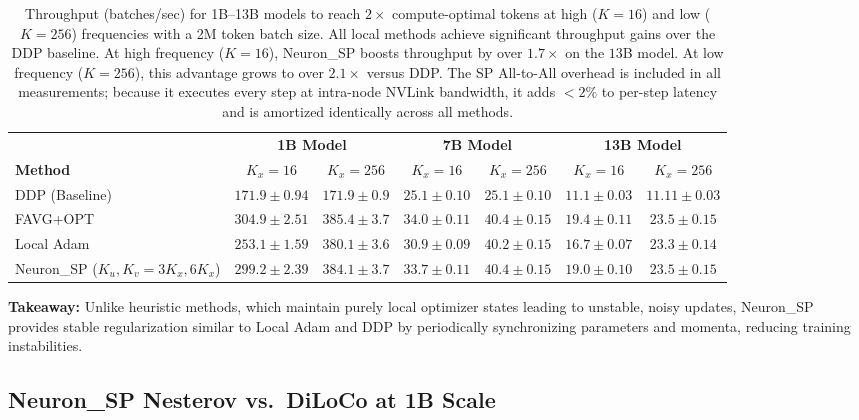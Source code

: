 \documentclass{article}
\begin{document}
\begin{table}[ht]
\centering
\caption{Throughput (batches/sec) for 1B--13B models to reach $2\times$ compute-optimal tokens at high ($K=16$) and low ($K=256$) frequencies with a 2M token batch size. All local methods achieve significant throughput gains over the DDP baseline. At high frequency ($K=16$), Neuron\_SP boosts throughput by over $1.7\times$ on the $13$B model. At low frequency ($K=256$), this advantage grows to over $2.1\times$ versus DDP. The SP All-to-All overhead is included in all measurements; because it executes every step at intra-node NVLink bandwidth, it adds $<2\%$ to per-step latency and is amortized identically across all methods.}
\label{tab:5}
\begin{tabular}{l c c c c c c}
\hline \hline
 & \multicolumn{2}{c}{\textbf{1B Model}} & \multicolumn{2}{c}{\textbf{7B Model}} & \multicolumn{2}{c}{\textbf{13B Model}} \\
\cline{2-7}
\textbf{Method} & $K_x\!=\!16$ & $K_x\!=\!256$ & $K_x\!=\!16$ & $K_x\!=\!256$ & $K_x\!=\!16$ & $K_x\!=\!256$ \\
\hline
DDP (Baseline) & $171.9 \pm 0.94$ & $171.9 \pm 0.9$ & $25.1 \pm 0.10$ & $25.1 \pm 0.10$ & $11.1 \pm 0.03$ & $11.11 \pm 0.03$ \\
\hline
FAVG+OPT & $304.9 \pm 2.51$ & $385.4 \pm 3.7$ & $34.0 \pm 0.11$ & $40.4 \pm 0.15$ & $19.4 \pm 0.11$ & $23.5 \pm 0.15$ \\
Local Adam & $253.1 \pm 1.59$ & $380.1 \pm 3.6$ & $30.9 \pm 0.09$ & $40.2 \pm 0.15$ & $16.7 \pm 0.07$ & $23.3 \pm 0.14$ \\
Neuron\_SP ($K_u,K_v\!=\!3K_x,6K_x$) & $299.2 \pm 2.39$ & $384.1 \pm 3.7$ & $33.7 \pm 0.11$ & $40.4 \pm 0.15$ & $19.0 \pm 0.10$ & $23.5 \pm 0.15$ \\
\hline \hline
\end{tabular}
\end{table}

\textbf{Takeaway:} Unlike heuristic methods, which maintain purely local optimizer states leading to unstable, noisy updates, Neuron\_SP provides stable regularization similar to Local Adam and DDP by periodically synchronizing parameters and momenta, reducing training instabilities.

\subsection{Neuron\_SP Nesterov vs.\ DiLoCo at 1B Scale}
\label{sec:b5_nesterov_diloco}
\end{document}
